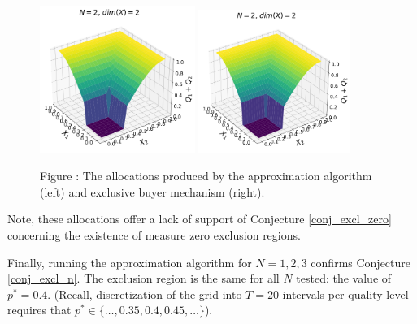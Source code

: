 \begin{figure}[H]
    \begin{center}
    \includegraphics[width=0.45\textwidth]{images/symmetric_independent_beta.png}
    \includegraphics[width=0.44\textwidth]{images/symmetric_independent_beta_ebm.png}
    \end{center}
    
    \vspace{1mm}
    \raggedright{\small {\sc Figure \thefig\label{fig:beta12_alloc}:} The allocations produced by the approximation algorithm (left) and exclusive buyer mechanism (right).} 
\end{figure}


\noindent Note, these allocations offer a lack of support of Conjecture \ref{conj_excl_zero} concerning the existence of measure zero exclusion regions.

Finally, running the approximation algorithm for $N=1,2,3$ confirms Conjecture \ref{conj_excl_n}. The exclusion region is the same for all $N$ tested: the value of $p^*=0.4$. (Recall, discretization of the grid into $T=20$ intervals per quality level requires that $p^* \in \{\dots, 0.35, 0.4, 0.45, \dots\}$).  


